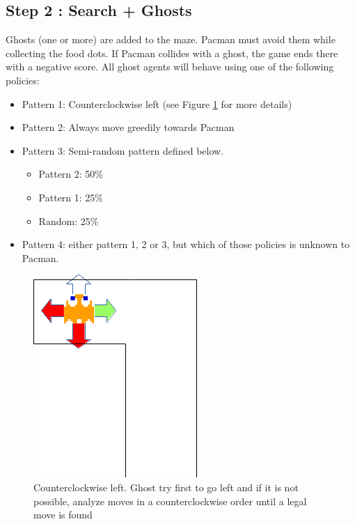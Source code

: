 \documentclass[12pt,a4paper,BCOR12mm, headexclude, footexclude, twoside, openright]{scrartcl}
\numberwithin{equation}{section} %
\numberwithin{figure}{section} %
\numberwithin{table}{section} %
\begin{document}
\subsection{Step 2 : Search + Ghosts}

Ghosts (one or more) are added to the maze. Pacman must avoid them while collecting the food dots. If Pacman collides with a ghost, the game ends there with a negative score. All ghost agents will behave using one of the following policies:

\begin{itemize}
	\item Pattern 1:  Counterclockwise left (see Figure \ref{counterclockwise} for more details)
    \item Pattern 2: Always move greedily towards Pacman
    \item Pattern 3: Semi-random pattern defined below.
    \begin{itemize}
    	\item Pattern 2: 50\%
        \item Pattern 1: 25\%
        \item Random: 25\%
    \end{itemize}
    \item Pattern 4: either pattern 1, 2 or 3, but which of those policies is unknown to Pacman.
\end{itemize}

\begin{figure}
	\label{counterclockwise}
	\begin{center}

	\includegraphics[scale=1]{ghostclockwiseleft.png}
    \caption{Counterclockwise left. Ghost try first to go left and if it is not possible, analyze moves in a counterclockwise order until a legal move is found}
    \end{center}
\end{figure}
\end{document}
